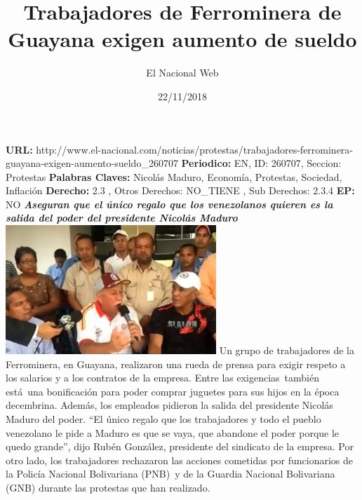 \documentclass{article}%
\title{\textbf{Trabajadores de Ferrominera de Guayana exigen aumento de sueldo}}%
\author{El Nacional Web}%
\date{22/11/2018}%
\begin{document}
%
\normalsize%
\maketitle%
\textbf{URL: }%
http://www.el{-}nacional.com/noticias/protestas/trabajadores{-}ferrominera{-}guayana{-}exigen{-}aumento{-}sueldo\_260707\newline%
%
\textbf{Periodico: }%
EN, %
ID: %
260707, %
Seccion: %
Protestas\newline%
%
\textbf{Palabras Claves: }%
Nicolás Maduro, Economía, Protestas, Sociedad, Inflación\newline%
%
\textbf{Derecho: }%
2.3%
, Otros Derechos: %
NO\_TIENE%
, Sub Derechos: %
2.3.4%
\newline%
%
\textbf{EP: }%
NO\newline%
\newline%
%
\textbf{\textit{Aseguran que el único regalo que los venezolanos quieren es la salida del poder del presidente Nicolás Maduro}}%
\newline%
\newline%
%
\includegraphics[width=300px]{108.jpg}%
\newline%
%
Un grupo de trabajadores de la Ferrominera, en Guayana, realizaron una rueda de prensa para exigir respeto a los salarios y a los contratos de la empresa.%
\newline%
%
Entre las exigencias~también está~una bonificación para poder comprar juguetes para sus hijos en la época decembrina.%
\newline%
%
Además, los empleados pidieron la salida del presidente Nicolás Maduro del poder.%
\newline%
%
“El único regalo que los trabajadores y todo el pueblo venezolano le pide a Maduro es que se vaya, que abandone el poder porque le quedo grande”, dijo Rubén González, presidente del sindicato de la empresa.%
\newline%
%
Por otro lado, los trabajadores rechazaron las acciones cometidas por funcionarios de la Policía Nacional Bolivariana (PNB)~y de la Guardia Nacional Bolivariana (GNB) durante las protestas que han realizado.%
\newline%
%
\end{document}
